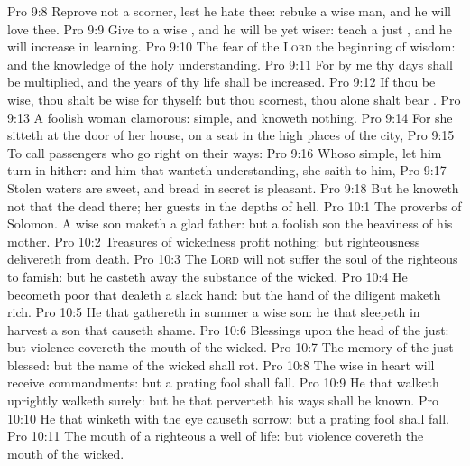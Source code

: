 \vs Pro 9:8 Reprove not a scorner, lest he hate thee: rebuke a wise man, and he will love thee.
\vs Pro 9:9 Give  to a wise , and he will be yet wiser: teach a just , and he will increase in learning.
\vs Pro 9:10 The fear of the \textsc{Lord}  the beginning of wisdom: and the knowledge of the holy  understanding.
\vs Pro 9:11 For by me thy days shall be multiplied, and the years of thy life shall be increased.
\vs Pro 9:12 If thou be wise, thou shalt be wise for thyself: but  thou scornest, thou alone shalt bear .
\vs Pro 9:13 A foolish woman  clamorous:  simple, and knoweth nothing.
\vs Pro 9:14 For she sitteth at the door of her house, on a seat in the high places of the city,
\vs Pro 9:15 To call passengers who go right on their ways:
\vs Pro 9:16 Whoso  simple, let him turn in hither: and  him that wanteth understanding, she saith to him,
\vs Pro 9:17 Stolen waters are sweet, and bread  in secret is pleasant.
\vs Pro 9:18 But he knoweth not that the dead  there;  her guests  in the depths of hell.
\vs Pro 10:1 The proverbs of Solomon. A wise son maketh a glad father: but a foolish son  the heaviness of his mother.
\vs Pro 10:2 Treasures of wickedness profit nothing: but righteousness delivereth from death.
\vs Pro 10:3 The \textsc{Lord} will not suffer the soul of the righteous to famish: but he casteth away the substance of the wicked.
\vs Pro 10:4 He becometh poor that dealeth  a slack hand: but the hand of the diligent maketh rich.
\vs Pro 10:5 He that gathereth in summer  a wise son:  he that sleepeth in harvest  a son that causeth shame.
\vs Pro 10:6 Blessings  upon the head of the just: but violence covereth the mouth of the wicked.
\vs Pro 10:7 The memory of the just  blessed: but the name of the wicked shall rot.
\vs Pro 10:8 The wise in heart will receive commandments: but a prating fool shall fall.
\vs Pro 10:9 He that walketh uprightly walketh surely: but he that perverteth his ways shall be known.
\vs Pro 10:10 He that winketh with the eye causeth sorrow: but a prating fool shall fall.
\vs Pro 10:11 The mouth of a righteous  a well of life: but violence covereth the mouth of the wicked.
